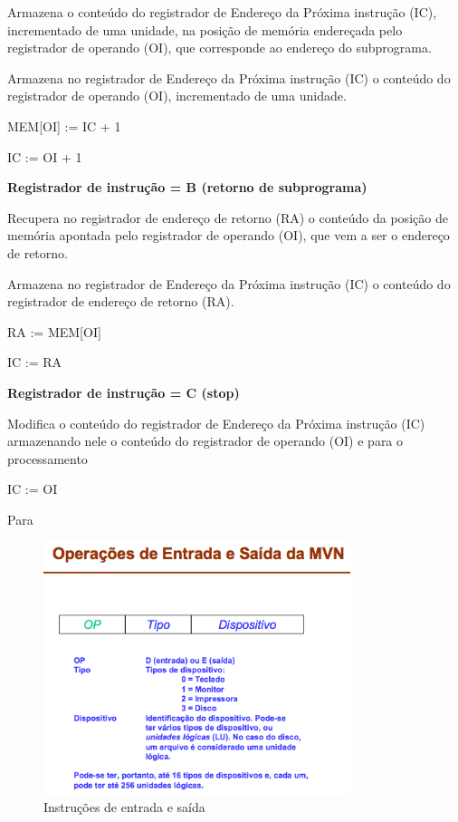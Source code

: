 Armazena o conteúdo do registrador de Endereço da Próxima instrução (IC), incrementado de uma unidade, na posição de memória endereçada pelo registrador de operando (OI), que corresponde ao endereço do subprograma.				


Armazena no registrador de Endereço da Próxima instrução (IC) o conteúdo do registrador de operando (OI), incrementado de uma unidade.


MEM[OI] := IC + 1


IC := OI + 1 


\textbf{Registrador de instrução = B (retorno de subprograma)}
			

Recupera no registrador de endereço de retorno (RA) o conteúdo da posição de memória apontada pelo registrador de operando (OI), que vem a ser o endereço de retorno.


Armazena no registrador de Endereço da Próxima instrução (IC) o conteúdo do registrador de endereço de retorno (RA).


RA := MEM[OI]


IC := RA 

		 	 	 		
			
\textbf{Registrador de instrução = C (stop)}


Modifica o conteúdo do registrador de Endereço da Próxima instrução (IC) armazenando nele o conteúdo do registrador de operando (OI) e para o processamento


IC := OI 


Para

\begin{figure}[H]
	\centering 
	\includegraphics[width=0.8\textwidth]{img/input_output.png}  
	\caption{Instruções de entrada e saída}
	\label{fig:input_output}
\end{figure}

